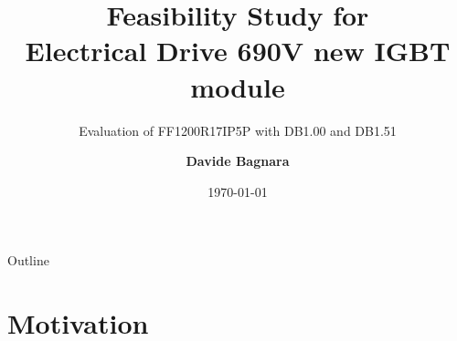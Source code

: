 \documentclass[aspectratio=169, 10pt]{beamer}
\title[DPT Results -- 690\,V Electrical DriveDrive]{%
  \textbf{Feasibility Study for \\[6pt] Electrical Drive 690V new IGBT module}}
\subtitle{Evaluation of FF1200R17IP5P with DB1.00 and DB1.51}
\author{\textbf{Davide Bagnara}}
\date{\today}
\begin{document}

\begin{frame}
  \titlepage
\end{frame}

\begin{frame}{Outline}
  \tableofcontents
\end{frame}

\section{Motivation}
\end{document}
